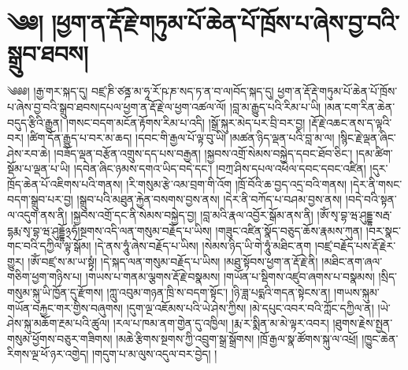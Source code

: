 \setcounter{footnote}{0} 
\chapter{༄༅། །ཕྱག་ན་རྡོ་རྗེ་གཏུམ་པོ་ཆེན་པོ་ཁྲོས་པ་ཞེས་བྱ་བའི་སྒྲུབ་ཐབས།}༄༅༅། །རྒྱ་གར་སྐད་དུ། བཛྲ་ཎི་ཙནྜ་མ་ཧཱ་རོ་ཥ་ཎ་སད་ཏ་ན་བ་ལ།བོད་སྐད་དུ། ཕྱག་ན་རྡོ་རྡེ་གཏུམ་པོ་ཆེན་པོ་ཁྲོས་པ་ཞེས་བྱ་བའི་སྒྲུབ་ཐབས།དཔལ་ཕྱག་ན་རྡོ་རྗེ་ལ་ཕྱག་འཚལ་ལོ། །བླ་མ་རྒྱུད་པའི་རིམ་པ་ཡི། །མན་ངག་རིན་ཆེན་བདུད་རྩིའི་རྒྱུན། །གསང་བདག་མངོན་རྟོགས་རིམ་པ་འདི། །སྒྲོ་སྐུར་མེད་པར་བྲི་བར་བྱ། །རྡོ་རྗེ་འཆང་ནས་ད་ལྟའི་བར། །ཚིག་དོན་རྒྱུད་པ་བར་མ་ཆད། །དབང་གི་རྒྱལ་པོ་ལྟ་བུ་ཡི། །མཚན་ཉིད་ལྡན་པའི་བླ་མ་ལ། །སྙིང་རྗེ་ལྡན་ཞིང་ཤེས་རབ་ཆེ། །བཟོད་ལྡན་བརྩོན་འགྲུས་དད་པས་བརྒྱན། །སྐྱབས་འགྲོ་སེམས་བསྐྱེད་དབང་ཐོབ་ཅིང་། །དམ་ཚིག་སྡོམ་པ་ལྡན་པ་ཡི། །དབེན་ཞིང་ཉམས་དགའ་ཡིད་བདེ་དང་། །བཀྲ་ཤིས་དཔལ་འཕེལ་དབང་དབང་འཛིན། །དུར་ཁྲོད་ཆེན་པོ་འཇིགས་པའི་གནས། །རི་གསུམ་རྩེ་འམ་བྲག་གི་འོག །ཁྲོ་བོའི་ཆ་བྱད་འདྲ་བའི་གནས། །དེར་ནི་གསང་བདག་སྒྲུབ་པར་བྱ། །སྒྲུབ་པའི་མཐུན་རྐྱེན་བསགས་བྱས་ནས། །དེར་ནི་བཀོད་པ་བཤམ་བྱས་ནས། །བདེ་བའི་སྟན་ལ་འདུག་ནས་ནི། །སྐྱབས་འགྲོ་དང་ནི་སེམས་བསྐྱེད་བྱ། །བླ་མའི་རྣལ་འབྱོར་སྒོམ་ནས་ནི། །ཨོཾ་སྭ་བྷ་ཝ་ཤུདྡྷ་སརྦ་དྷརྨ་སྭ་བྷ་ཝ་ཤུདྡྷོ྅ཧཾ།སྔགས་འདི་ལན་གསུམ་བརྗོད་པ་ཡིས། །གཟུང་འཛིན་སྣོད་བཅུད་ཆོས་རྣམས་ཀུན། །བར་སྣང་གང་བའི་དཀྱིལ་ལྟ་སྒོམ། །དེ་ནས་ཧཱུཾ་ཞེས་བརྗོད་པ་ཡིས། །སེམས་ཉིད་ཡི་གེ་ཧཱུཾ་མཐིང་ནག །བཛྲ་བརྗོད་པས་རྡོ་རྗེར་གྱུར། །ཨོཾ་བཛྲ་ས་མ་ཡ་སྟྭཾ། །དེ་སྐད་ལན་གསུམ་བརྗོད་པ་ཡིས། །མཐུ་སྟོབས་ཕྱག་ན་རྡོ་རྗེ་ནི། །མཐིང་ནག་ཞལ་གཅིག་ཕྱག་གཉིས་པ། །གཡས་པ་གནམ་ལྕགས་རྡོ་རྗེ་བསྣམས། །གཡོན་པ་སྡིགས་འཛུབ་ཞགས་པ་བསྣམས། །སྲིད་གསུམ་སྐུ་ཡི་ཁྱོན་དུ་རྫོགས། །ཀླུ་འབུམ་གཉན་ཁྲི་ས་བདག་སྟོང་། །ཉི་ཟླ་པདྨའི་གདན་སྟེངས་ན། །གཡས་སྐུམ་གཡོན་བརྐྱང་གར་གྱིས་བཞུགས། །དུག་ལྔ་འཇོམས་པའི་ཡེ་ཤེས་ཀྱིས། །མེ་དཔུང་འབར་བའི་ཀློང་དཀྱིལ་ན། །ཡེ་ཤེས་སྐུ་མཆོག་རྔམ་པའི་ཚུལ། །རལ་པ་ཁམ་ནག་གྱེན་དུ་འཁྱིལ། །རྨ་ར་སྨིན་མ་མེ་ལྟར་འབར། །ཐུགས་རྗེས་སྤྱན་གསུམ་ཕྱོགས་བཅུར་གཟིགས། །མཆེ་རྩིགས་སྔགས་ཀྱི་འབྲུག་སྒྲ་སྒྲོགས། །ཁྲོ་རྒྱལ་སྣ་ཚོགས་སྐུ་ལ་འཕྲོ། །ཁྱུང་ཆེན་རིགས་ལྔ་ཕོ་ཉར་འགྱེད། །གདུག་པ་མ་ལུས་འདུལ་བར་བྱེད། །
